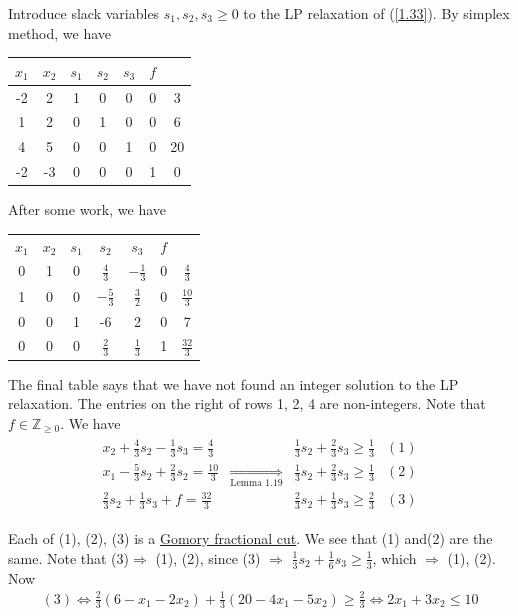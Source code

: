 Introduce slack variables $s_1, s_2, s_3\geqslant 0$ to the LP relaxation of (\ref{1.33}). By simplex method, we have
\begin{table}[H]
    \centering
    \begin{tabular}{cccccc|c}
         $x_1$ & $x_2$ & $s_1$ & $s_2$ & $s_3$ & $f$ & \\ \hline
         -2 & 2 & 1 & 0 & 0 & 0 & 3\\ 
         1 & 2 & 0 & 1& 0 & 0 & 6\\
         4 & 5 & 0 & 0 & 1 & 0 & 20\\ \hline
         -2 & -3 & 0 & 0 & 0 & 1 & 0
    \end{tabular}
\end{table}
After some work, we have
\begin{table}[H]
    \centering
    \begin{tabular}{cccccc|c}
         $x_1$ & $x_2$ & $s_1$ & $s_2$ & $s_3$ & $f$ &   \\
         0 & 1 & 0 & $\frac{4}{3}$ & $-\frac{1}{3}$ & 0 & $\frac{4}{3}$\\ \hline
         1 & 0 & 0 & $-\frac{5}{3}$ & $\frac{3}{2}$ & 0 & $\frac{10}{3}$\\
         0 & 0 & 1 & -6 & 2 & 0 & 7\\ \hline
         0 & 0 & 0 & $\frac{2}{3}$ & $\frac{1}{3}$ & 1 & $\frac{32}{3}$
    \end{tabular}
\end{table}

The final table says that we have not found an integer solution to the LP relaxation. The entries on the right of rows 1, 2, 4 are non-integers. Note that $f\in\mathbb{Z}_{\geqslant 0}$. We have
\begin{align*}
    \begin{array}{llll}
         x_2+\frac{4}{3}s_2-\frac{1}{3}s_3 = \frac{4}{3} & & \frac{1}{3}s_2 + \frac{2}{3}s_3\geqslant \frac{1}{3} & (1)  \\
         x_1 - \frac{5}{3}s_2 + \frac{2}{3}s_2 = \frac{10}{3} & \underset{\text{Lemma 1.19}}{\Longrightarrow} & \frac{1}{3}s_2 + \frac{2}{3}s_3\geqslant \frac{1}{3} & (2) \\
         \frac{2}{3}s_2 + \frac{1}{3}s_3 + f = \frac{32}{3} & & \frac{2}{3}s_2 + \frac{1}{3}s_3\geqslant \frac{2}{3} & (3)
    \end{array}
\end{align*}

Each of (1), (2), (3) is a \uline{Gomory fractional cut}. We see that (1) and(2) are the same. Note that (3)$\Longrightarrow$ (1), (2), since (3) $\Longrightarrow$ $\frac{1}{3}s_2+ \frac{1}{6}s_3\geqslant \frac{1}{3}$, which $\Longrightarrow$ (1), (2). Now
\begin{align*}
    (3) \Longleftrightarrow \frac{2}{3}(6-x_1-2x_2)+\frac{1}{3}(20-4x_1-5x_2)\geqslant \frac{2}{3} \Longleftrightarrow 2x_1+3x_2\leqslant 10
\end{align*}

